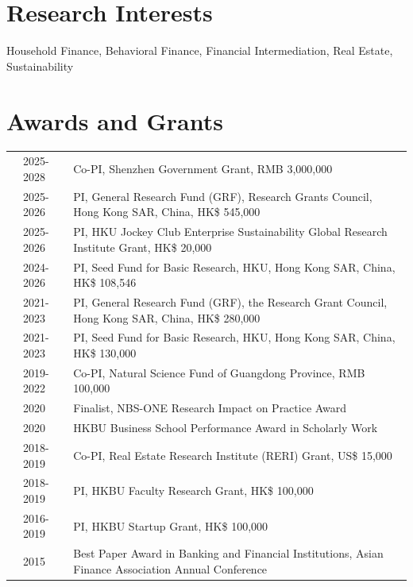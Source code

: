\documentclass[margin,line]{res}
\newenvironment{list1}{
  \begin{list}{\ding{113}}{%
      \setlength{\itemsep}{0in}
      \setlength{\parsep}{0in} \setlength{\parskip}{0in}
      \setlength{\topsep}{0in} \setlength{\partopsep}{0in} 
      \setlength{\leftmargin}{0.17in}}}{\end{list}}
\begin{document}
\begin{resume}
\section{\sc Research Interests}
\begin{list1}
\item[]  Household Finance, Behavioral Finance, Financial Intermediation, Real Estate, Sustainability  %
\end{list1}

\section{\sc Awards and Grants}
\vspace{.1cm}
\begin{tabular}{@{}p{0.0 in}p{0.6 in}p{4.60in}}
	& 2025-2028 & Co-PI, Shenzhen Government Grant, RMB 3,000,000 \\
	& 2025-2026 & PI, General Research Fund (GRF), Research Grants Council, Hong Kong SAR, China, HK\$ 545,000 \\
	& 2025-2026 & PI, HKU Jockey Club Enterprise Sustainability Global Research Institute Grant, HK\$ 20,000 \\
	& 2024-2026 & PI, Seed Fund for Basic Research, HKU, Hong Kong SAR, China, HK\$ 108,546 \\
	& 2021-2023 & PI, General Research Fund (GRF), the Research Grant Council, Hong Kong SAR, China, HK\$ 280,000 \\
	& 2021-2023 & PI, Seed Fund for Basic Research, HKU, Hong Kong SAR, China, HK\$ 130,000 \\	
	& 2019-2022   & Co-PI, Natural Science Fund of Guangdong Province, RMB 100,000 \\
	& 2020   & Finalist, NBS-ONE Research Impact on Practice Award \\
	& 2020   & HKBU Business School Performance Award in Scholarly Work \\	
	& 2018-2019   & Co-PI, Real Estate Research Institute (RERI) Grant, US\$ 15,000 \\
	& 2018-2019   & PI, HKBU Faculty Research Grant, HK\$ 100,000 \\
	& 2016-2019   & PI, HKBU Startup Grant, HK\$ 100,000 \\			
	& 2015   & Best Paper Award in Banking and Financial Institutions, Asian Finance Association
	Annual Conference \\		
\end{tabular}

\end{resume}
\end{document}
